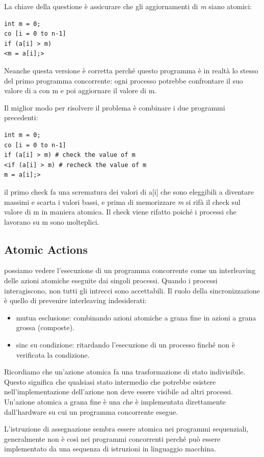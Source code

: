 \documentclass[10pt,a4paper]{article}
\begin{document}
La chiave della questione è assicurare che gli aggiornamenti di \textit{m} siano atomici:
\begin{verbatim}
int m = 0;
co [i = 0 to n-1]
if (a[i] > m)
<m = a[i];>
\end{verbatim} 
Neanche questa versione è corretta perché questo programma è in realtà lo stesso del primo programma concorrente: ogni processo potrebbe confrontare il suo valore di a con m e poi aggiornare il valore di m.

Il miglior modo per risolvere il problema è combinare i due programmi precedenti:
\begin{verbatim}
int m = 0;
co [i = 0 to n-1]
if (a[i] > m) # check the value of m
<if (a[i] > m) # recheck the value of m
m = a[i];>
\end{verbatim}

il primo check fa una scrematura dei valori di a[i] che sono eleggibili a diventare massimi e scarta i valori bassi, e prima di memorizzare \textit{m} si rifà il check sul valore di m in maniera atomica. Il check viene rifatto poiché i processi che lavorano su m sono molteplici.

\subsection{Atomic Actions}
possiamo vedere l'esecuzione di un programma concorrente come un interleaving delle azioni atomiche eseguite dai singoli processi. Quando i processi interagiscono, non tutti gli intrecci sono accettabili. Il ruolo della sincronizzazione è quello di prevenire interleaving indesiderati: 
\begin{itemize}
\item mutua esclusione: combinando azioni atomiche a grana fine in azioni a grana grossa (composte).
\item sinc su condizione: ritardando l'esecuzione di un processo finché non è verificata la condizione.
\end{itemize}

Ricordiamo che un'azione atomica fa una trasformazione di stato indivisibile. Questo
significa che qualsiasi stato intermedio che potrebbe esistere nell'implementazione dell'azione
non deve essere visibile ad altri processi. Un'azione atomica a grana fine è una
che è implementata direttamente dall'hardware su cui un programma concorrente
esegue.

L'istruzione di assegnazione sembra essere atomica nei programmi sequenziali, generalmente non è così nei programmi concorrenti perché può essere implementato da una sequenza di istruzioni in linguaggio macchina.
\end{document}
